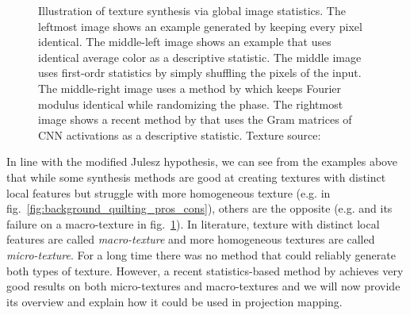 \begin{figure}[ht]
    \centering
    \caption{Illustration of texture synthesis via global image statistics. The leftmost image shows an example generated by keeping every pixel identical. The middle-left image shows an example that uses identical average color as a descriptive statistic. The middle image uses first-ordr statistics by simply shuffling the pixels of the input. The middle-right image uses a method by \citet{Galerne2011} which keeps Fourier modulus identical while randomizing the phase. The rightmost image shows a recent method by \citet{Gatys2015} that uses the Gram matrices of CNN activations as a descriptive statistic. Texture source: \citet{Gatys2015}}
    \label{fig:background_statistics_example}
\end{figure}

In line with the modified Julesz hypothesis, we can see from the examples above that while some synthesis methods are good at creating textures with distinct local features but struggle with more homogeneous texture (e.g. \citet{Efros2001} in fig.~\ref{fig:background_quilting_pros_cons}), others are the opposite (e.g. \citet{Galerne2011} and its failure on a macro-texture in fig.~\ref{fig:background_statistics_example}). In literature, texture with distinct local features are called \textit{macro-texture} and more homogeneous textures are called \textit{micro-texture}. For a long time there was no method that could reliably generate both types of texture. However, a recent statistics-based method by \citet{Gatys2015} achieves very good results on both micro-textures and macro-textures and we will now provide its overview and explain how it could be used in projection mapping.

